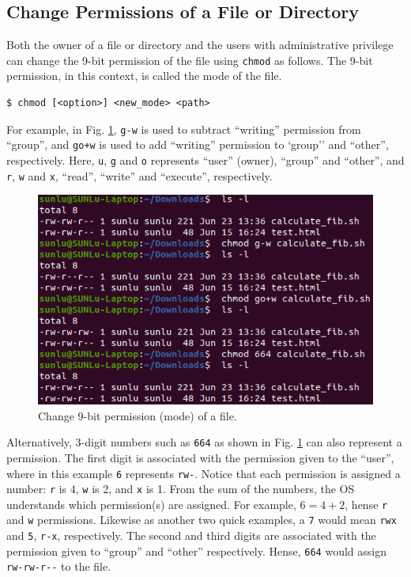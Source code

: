 \subsection{Change Permissions of a File or Directory}

Both the owner of a file or directory and the users with administrative privilege can change the 9-bit permission of the file using \verb|chmod| as follows. The 9-bit permission, in this context, is called the mode of the file.
\begin{lstlisting}
$ chmod [<option>] <new_mode> <path>
\end{lstlisting}
For example, in Fig. \ref{ch:fm:fig:chmodexp}, \verb|g-w| is used to subtract ``writing'' permission from ``group'', and \verb|go+w| is used to add ``writing'' permission to `group'' and ``other'', respectively. Here, \verb|u|, \verb|g| and \verb|o| represents ``user'' (owner), ``group'' and ``other'', and \verb|r|, \verb|w| and \verb|x|, ``read'', ``write'' and ``execute'', respectively.
\begin{figure}[htbp]
	\centering
	\includegraphics[width=350pt]{chapters/part-1/figures/chmodexp.png}
	\caption{Change 9-bit permission (mode) of a file.} \label{ch:fm:fig:chmodexp}
\end{figure}
Alternatively, 3-digit numbers such as \verb|664| as shown in Fig. \ref{ch:fm:fig:chmodexp} can also represent a permission. The first digit is associated with the permission given to the ``user'', where in this example \verb|6| represents \verb|rw-|. Notice that each permission is assigned a number: \verb|r| is 4, \verb|w| is 2, and \verb|x| is 1. From the sum of the numbers, the OS understands which permission(s) are assigned. For example, $6=4+2$, hense \verb|r| and \verb|w| permissions. Likewise as another two quick examples, a \verb|7| would mean \verb|rwx| and \verb|5|, \verb|r-x|, respectively. The second and third digits are associated with the permission given to ``group'' and ``other'' respectively. Hense, \verb|664| would assign \verb|rw-rw-r--| to the file.

